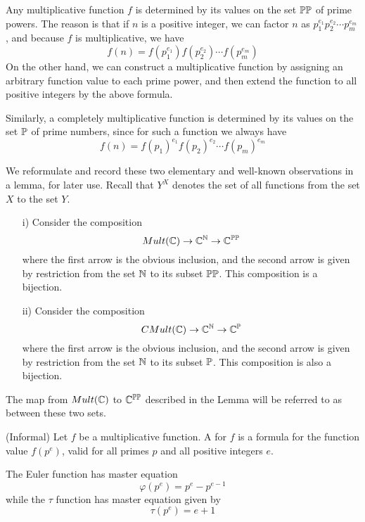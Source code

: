 Any multiplicative function $f$ is determined by its values on the set $\mathbb{PP}$ of prime powers. The reason is that if $n$ is a positive integer, we can factor $n$ as $p_1^{e_1} p_2^{e_2} \cdots p_m^{e_m}$, and because $f$ is multiplicative, we have
$$ f(n) = f(p_1^{e_1}) f( p_2^{e_2}) \cdots f(p_m^{e_m})   $$
On the other hand, we can construct a multiplicative function by assigning an arbitrary function value to each prime power, and then extend the function to all positive integers by the above formula.

Similarly, a completely multiplicative function is determined by its values on the set $\mathbb{P}$ of prime numbers, since for such a function we always have
$$  f(n) = f(p_1)^{e_1} f( p_2)^{e_2} \cdots f(p_m)^{e_m}  $$

We reformulate and record these two elementary and well-known observations in a lemma, for later use. Recall that $Y^X$ denotes the set of all functions from the set $X$ to the set $Y$.


\begin{lemma} \label{AffineSpaceLemma}
\begin{itemize}
\item[i)] Consider the composition
$$ Mult(\mathbb{C}) \rightarrow \mathbb{C}^{\mathbb{N}} \rightarrow \mathbb{C}^{\mathbb{PP}}   $$
where the first arrow is the obvious inclusion, and the second arrow is given by restriction from the set $\mathbb{N}$ to its subset $\mathbb{PP}$. This composition is a bijection.
\item[ii)] Consider the composition
$$ CMult(\mathbb{C}) \rightarrow \mathbb{C}^{\mathbb{N}} \rightarrow \mathbb{C}^{\mathbb{P}}   $$
where the first arrow is the obvious inclusion, and the second arrow is given by restriction from the set $\mathbb{N}$ to its subset $\mathbb{P}$. This composition is also a bijection.
\end{itemize}
\end{lemma}

\begin{definition}
The map from $Mult(\mathbb{C})$ to $\mathbb{C}^{\mathbb{PP}}$ described in the Lemma will be referred to as  between these two sets.
\end{definition}

\begin{definition}
(Informal) Let $f$ be a multiplicative function. A  for $f$ is a formula for the function value $f(p^e)$, valid for all primes $p$ and all positive integers $e$.
\end{definition}

\begin{example}
The Euler function has master equation
$$ \varphi(p^e) = p^e - p^{e-1}   $$
while the $\tau$ function has master equation given by
$$ \tau(p^e) = e+1  $$
\end{example}

